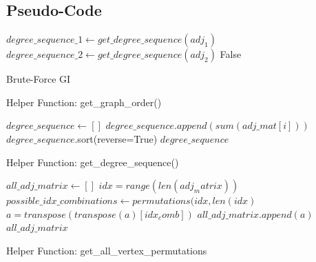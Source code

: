 \documentclass[11pt]{article}
\begin{document}
\subsection{Pseudo-Code}
\SetAlgoLined
\begin{algorithm}
  \DontPrintSemicolon
  
  $degree\_sequence\_1 \gets get\_degree\_sequence(adj_1)$\;
  $degree\_sequence\_2 \gets get\_degree\_sequence(adj_2)$\;
  \Return False
  \caption{Brute-Force GI}
  \label{algorithm1}
\end{algorithm}

\begin{algorithm}
  \DontPrintSemicolon
  \caption{Helper Function: get\_graph\_order()}
\end{algorithm}

\begin{algorithm}
  \DontPrintSemicolon
  $degree\_sequence \gets []$\;
  {
  $degree\_sequence.append (sum(adj\_mat[i]))$\;
  $degree\_sequence$.sort(reverse=True)\;
    \Return $degree\_sequence$
  }
  \caption{Helper Function: get\_degree\_sequence()}
\end{algorithm}

\begin{algorithm}
  \DontPrintSemicolon
  $all\_adj\_matrix \gets []$\;
  $idx = range(len(adj_matrix))$\;
  $possible\_idx\_combinations \gets permutations(idx, len(idx)$\;
  {
  $a = transpose(transpose(a)[idx_comb])$\;
  $all\_adj\_matrix.append(a)$\;
  }
   \Return $all\_adj\_matrix$
  \caption{Helper Function: get\_all\_vertex\_permutations}
\end{algorithm}
\end{document}
